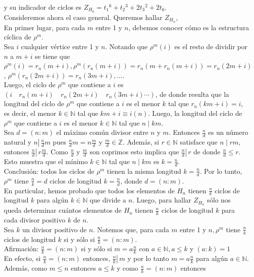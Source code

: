 \documentclass[10pt]{article}
\begin{document}
y su indicador de ciclos es $Z_{H_{6}}=t_{1}{ }^{6}+t_{2}{ }^{3}+2 t_{3}{ }^{2}+2 t_{6}$.\\
Consideremos ahora el caso general. Queremos hallar $Z_{H_{n}}$,\\
En primer lugar, para cada $m$ entre 1 y $n$, debemos conocer cómo es la estructura cíclica de $\rho^{m}$.\\
Sea $i$ cualquier vértice entre 1 y $n$. Notando que $\rho^{m}(i)$ es el resto de dividir por $n$ a $m+i$ se tiene que $\rho^{m}(i)=r_{n}(m+i), \rho^{m}\left(r_{n}(m+i)\right)=r_{n}\left(m+r_{n}(m+i)\right)=r_{n}(2 m+i)$, $\rho^{m}\left(r_{n}(2 m+i)\right)=r_{n}(3 m+i), \ldots$.\\
Luego, el ciclo de $\rho^{m}$ que contiene a $i$ es $\left(i \quad r_{n}(m+i) \quad r_{n}(2 m+i) \quad r_{n}(3 m+i) \cdots\right)$, de donde resulta que la longitud del ciclo de $\rho^{m}$ que contiene a $i$ es el menor $k$ tal que $r_{n}(k m+i)=i$, es decir, el menor $k \in \mathbb{N}$ tal que $k m+i \equiv i(n)$. Luego, la longitud del ciclo de $\rho^{m}$ que contiene a $i$ es el menor $k \in \mathbb{N}$ tal que $n \mid k m$.\\
Sea $d=(n: m)$ el máximo común divisor entre $n$ y $m$. Entonces $\frac{n}{d}$ es un número natural y $n \left\lvert\, \frac{n}{d} m\right.$ pues $\frac{n}{d} m=n \frac{m}{d}$ y $\frac{m}{d} \in \mathbb{Z}$. Además, si $r \in \mathbb{N}$ satisface que $n \mid r m$, entonces $\frac{n}{d} \left\lvert\, r \frac{m}{d}\right.$. Como $\frac{n}{d}$ y $\frac{m}{d}$ son coprimos esto implica que $\left.\frac{n}{d} \right\rvert\, r$ de donde $\frac{n}{d} \leq r$. Esto muestra que el mínimo $k \in \mathbb{N}$ tal que $n \mid k m$ es $k=\frac{n}{d}$.\\
Conclusión: todos los ciclos de $\rho^{m}$ tienen la misma longitud $k=\frac{n}{d}$. Por lo tanto, $\rho^{m}$ tiene $\frac{n}{k}=d$ ciclos de longitud $k=\frac{n}{d}$, donde $d=(n: m)$.\\
En particular, hemos probado que todos los elementos de $H_{n}$ tienen $\frac{n}{k}$ ciclos de longitud $k$ para algún $k \in \mathbb{N}$ que divide a $n$. Luego, para hallar $Z_{H_{n}}$ sólo nos queda determinar cuántos elementos de $H_{n}$ tienen $\frac{n}{k}$ ciclos de longitud $k$ para cada divisor positivo $k$ de $n$.\\
Sea $k$ un divisor positivo de $n$. Notemos que, para cada $m$ entre 1 y $n, \rho^{m}$ tiene $\frac{n}{k}$ ciclos de longitud $k$ si y sólo si $\frac{n}{k}=(n: m)$.\\
Afirmación: $\frac{n}{k}=(n: m)$ si y sólo si $m=a \frac{n}{k}$ con $a \in \mathbb{N}, a \leq k$ y $(a: k)=1$\\
En efecto, si $\frac{n}{k}=(n: m)$ entonces, $\left.\frac{n}{k} \right\rvert\, m$ y por lo tanto $m=a \frac{n}{k}$ para algún $a \in \mathbb{N}$. Además, como $m \leq n$ entonces $a \leq k$ y como $\frac{n}{k}=(n: m)$ entonces
\end{document}
